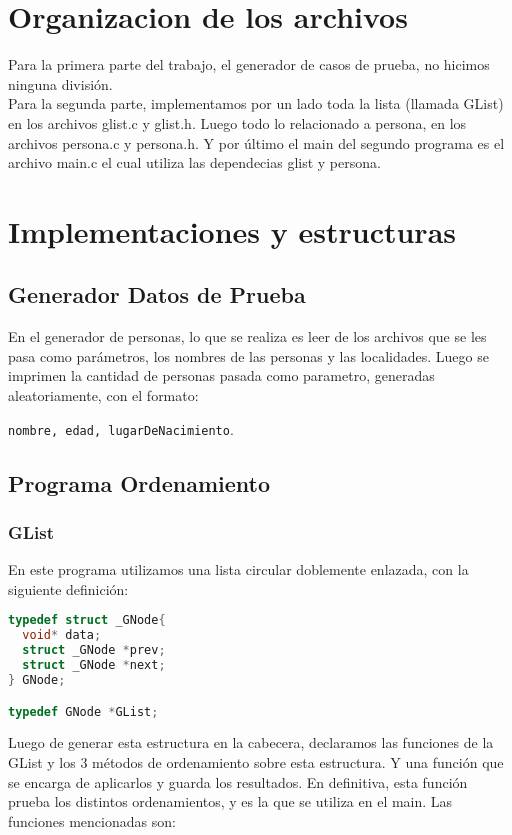 \documentclass[]{article}
\begin{document}
\section{Organizacion de los archivos}
Para la primera parte del trabajo, el generador de casos de prueba, no hicimos ninguna división.\\
Para la segunda parte, implementamos por un lado toda la lista (llamada GList) en los archivos glist.c y glist.h. Luego todo lo relacionado a persona, en los archivos persona.c y persona.h. Y por último el main del segundo programa es el archivo main.c el cual utiliza las dependecias glist y persona.
\newpage
\section{Implementaciones y estructuras}
\subsection{Generador Datos de Prueba}

En el generador de personas, lo que se realiza es leer de los archivos que se les pasa como parámetros, los nombres de las personas y las localidades. 
Luego se imprimen la cantidad de personas pasada como parametro, generadas aleatoriamente, con el formato:

\verb|nombre, edad, lugarDeNacimiento|.

\subsection{Programa Ordenamiento}
\subsubsection{GList}

En este programa utilizamos una lista circular doblemente enlazada, con la siguiente definición:

\begin{lstlisting}[language=C]
typedef struct _GNode{
  void* data;
  struct _GNode *prev;
  struct _GNode *next;
} GNode;

typedef GNode *GList;
\end{lstlisting}

Luego de generar esta estructura en la cabecera, declaramos las funciones de la GList y los 3 métodos de ordenamiento sobre esta estructura. Y una función que se encarga de aplicarlos y guarda los resultados. En definitiva, esta función prueba los distintos ordenamientos, y es la que se utiliza en el main.
Las funciones mencionadas son:
\end{document}
